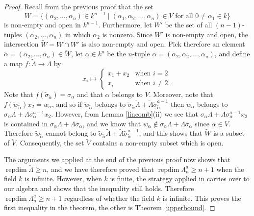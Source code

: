 \documentclass[a4paper]{amsart}
\theoremstyle{definition}
\theoremstyle{definition}
\theoremstyle{definition}
\theoremstyle{definition}
\theoremstyle{definition}
\theoremstyle{definition}
\theoremstyle{remark}
\theoremstyle{remark}
\theoremstyle{definition}
\theoremstyle{definition}
\begin{document}
\begin{proof}
Recall from the previous proof that the set
$$W = \{ ( \alpha_2, \dots, \alpha_n ) \in k^{n-1} \mid ( \alpha_1, \alpha_2,
\dots, \alpha_n) \in V \text{ for all } 0 \neq \alpha_1 \in k \}$$
is non-empty and open in $k^{n-1}$. Furthermore, let $W'$ be the set
of all $(n-1)$-tuples $( \alpha_2, \dots, \alpha_n )$ in which
$\alpha_2$ is nonzero. Since $W'$ is non-empty and open, the
intersection $\tilde{W} = W \cap W'$ is also non-empty and open.
Pick therefore an element $\tilde{\alpha} = ( \alpha_2, \dots,
\alpha_n ) \in \tilde{W}$, let $\alpha \in k^n$ be the $n$-tuple
$\alpha = ( \alpha_2, \alpha_2, \dots, \alpha_n )$, and define a map
$f \colon \tilde{\Lambda} \to \Lambda$ by
$$x_i \mapsto \left \{
\begin{array}{ll}
x_1 + x_2 & \text{when } i=2 \\
x_i & \text{when } i \neq 2.
\end{array}
\right.$$ Note that $f( \tilde{\sigma}_{\tilde{\alpha}}) =
\sigma_{\alpha}$ and that $\alpha$ belongs to $V$. Moreover, note
that $f( \tilde{w}_{\tilde{\alpha}}) x_2 = w_{\alpha}$, and so if
$\tilde{w}_{\tilde{\alpha}}$ belongs to
$\tilde{\sigma}_{\tilde{\alpha}} \tilde{\Lambda} + \tilde{\Lambda}
\tilde{\sigma}_{\tilde{\alpha}}^{a-1}$ then $w_{\alpha}$ belongs to
$\sigma_{\alpha} \Lambda + \Lambda \sigma_{\alpha}^{a-1} x_2$.
However, from Lemma \ref{lincomb}(ii) we see that $\sigma_{\alpha}
\Lambda + \Lambda \sigma_{\alpha}^{a-1} x_2$ is contained in
$\sigma_{\alpha} \Lambda + \Lambda \sigma_{\alpha}$, and we know
that $w_{\alpha} \notin \sigma_{\alpha} \Lambda + \Lambda
\sigma_{\alpha}$ since $\alpha \in V$. Therefore
$\tilde{w}_{\tilde{\alpha}}$ cannot belong to
$\tilde{\sigma}_{\tilde{\alpha}} \tilde{\Lambda} + \tilde{\Lambda}
\tilde{\sigma}_{\tilde{\alpha}}^{a-1}$, and this shows that
$\tilde{W}$ is a subset of $\tilde{V}$. Consequently, the set
$\tilde{V}$ contains a non-empty subset which is open.

The arguments we applied at the end of the previous proof now shows
that ${\operatorname{repdim}\nolimits} \tilde{\Lambda} \ge n$, and we have therefore proved
that ${\operatorname{repdim}\nolimits} \Lambda_n^a \ge n+1$ when the field $k$ is infinite.
However, when $k$ is finite, the strategy applied in \cite[Section
4]{Oppermann1} carries over to our algebra and shows that the
inequality still holds. Therefore ${\operatorname{repdim}\nolimits} \Lambda_n^a \ge n+1$
regardless of whether the field $k$ is infinite. This proves the
first inequality in the theorem, the other is Theorem
\ref{upperbound}.
\end{proof}
\end{document}
